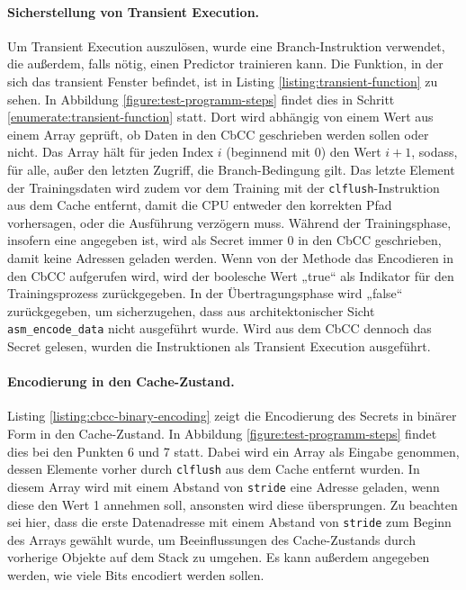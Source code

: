 \paragraph{Sicherstellung von Transient Execution.}
Um Transient Execution auszulösen, wurde eine Branch-Instruktion
verwendet, die außerdem, falls nötig, einen Predictor
trainieren kann. Die Funktion, in der sich das transient
Fenster befindet, ist in Listing \ref{listing:transient-function}
zu sehen. In Abbildung \ref{figure:test-programm-steps} findet
dies in Schritt \ref{enumerate:transient-function} statt. Dort
wird abhängig von einem Wert aus einem Array
geprüft, ob Daten in den \ac{CbCC} geschrieben werden sollen
oder nicht. Das Array hält für jeden Index $i$ (beginnend mit 0)
den Wert $i+1$, sodass, für alle, außer den letzten Zugriff,
die Branch-Bedingung gilt. Das letzte Element der Trainingsdaten wird
zudem vor dem Training mit der \verb|clflush|-Instruktion aus dem
Cache entfernt, damit die \ac{CPU} entweder den korrekten Pfad
vorhersagen, oder die Ausführung verzögern muss.
Während der Trainingsphase, insofern
eine angegeben ist, wird als Secret immer 0 in den \ac{CbCC}
geschrieben, damit keine Adressen geladen werden. Wenn von der
Methode das Encodieren in den \ac{CbCC} aufgerufen wird, wird
der boolesche Wert „true“ als Indikator für den Trainingsprozess
zurückgegeben. In der Übertragungsphase wird „false“
zurückgegeben, um sicherzugehen, dass aus architektonischer Sicht
\verb|asm_encode_data| nicht ausgeführt wurde. Wird aus dem
\ac{CbCC} dennoch das Secret gelesen, wurden die Instruktionen
als Transient Execution ausgeführt.

\paragraph{Encodierung in den Cache-Zustand.}
Listing \ref{listing:cbcc-binary-encoding} zeigt die Encodierung
des Secrets in binärer Form in den Cache-Zustand. In Abbildung
\ref{figure:test-programm-steps} findet dies bei den Punkten
6 und 7 statt. Dabei
wird ein Array als Eingabe genommen, dessen Elemente vorher durch
\verb|clflush| aus dem Cache entfernt wurden. In diesem Array
wird mit einem Abstand von \verb|stride| eine Adresse geladen,
wenn diese den Wert 1 annehmen soll, ansonsten wird diese
übersprungen. Zu beachten sei hier, dass die erste
Datenadresse mit einem Abstand von \verb|stride| zum Beginn des
Arrays gewählt wurde, um Beeinflussungen des Cache-Zustands durch
vorherige Objekte auf dem Stack zu umgehen. Es kann außerdem
angegeben werden, wie viele Bits encodiert werden sollen.

